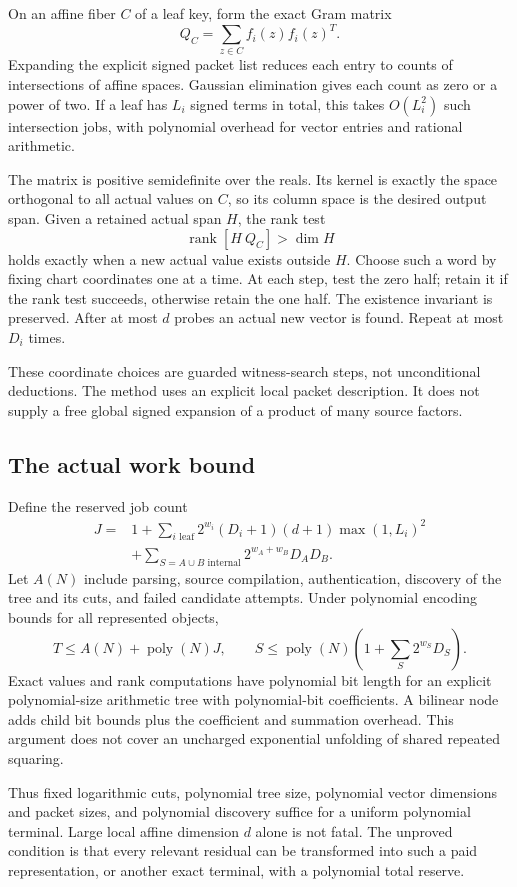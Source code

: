\documentclass[11pt,letterpaper]{article}
\theoremstyle{definition}
\newcommand{\poly}{\operatorname{poly}}
\newcommand{\rank}{\operatorname{rank}}
\begin{document}
On an affine fiber $C$ of a leaf key, form the exact Gram matrix
\[
Q_C=\sum_{z\in C} f_i(z)f_i(z)^T.
\]
Expanding the explicit signed packet list reduces each entry to counts of intersections of affine spaces. Gaussian elimination gives each count as zero or a power of two. If a leaf has $L_i$ signed terms in total, this takes $O(L_i^2)$ such intersection jobs, with polynomial overhead for vector entries and rational arithmetic.

The matrix is positive semidefinite over the reals. Its kernel is exactly the space orthogonal to all actual values on $C$, so its column space is the desired output span. Given a retained actual span $H$, the rank test
\[
\rank[H\ Q_C]>\dim H
\]
holds exactly when a new actual value exists outside $H$. Choose such a word by fixing chart coordinates one at a time. At each step, test the zero half; retain it if the rank test succeeds, otherwise retain the one half. The existence invariant is preserved. After at most $d$ probes an actual new vector is found. Repeat at most $D_i$ times.

These coordinate choices are guarded witness-search steps, not unconditional deductions. The method uses an explicit local packet description. It does not supply a free global signed expansion of a product of many source factors.

\subsection{The actual work bound}

Define the reserved job count
\begin{align}
J={}&1+\sum_{i\text{ leaf}}2^{w_i}(D_i+1)(d+1)\max(1,L_i)^2\\
&+\sum_{S=A\cup B\text{ internal}}2^{w_A+w_B}D_A D_B.\label{eq:jobs}
\end{align}
Let $A(N)$ include parsing, source compilation, authentication, discovery of the tree and its cuts, and failed candidate attempts. Under polynomial encoding bounds for all represented objects,
\[
T\le A(N)+\poly(N)J,
\qquad
S\le\poly(N)\left(1+\sum_S2^{w_S}D_S\right).
\]
Exact values and rank computations have polynomial bit length for an explicit polynomial-size arithmetic tree with polynomial-bit coefficients. A bilinear node adds child bit bounds plus the coefficient and summation overhead. This argument does not cover an uncharged exponential unfolding of shared repeated squaring.

Thus fixed logarithmic cuts, polynomial tree size, polynomial vector dimensions and packet sizes, and polynomial discovery suffice for a uniform polynomial terminal. Large local affine dimension $d$ alone is not fatal. The unproved condition is that every relevant residual can be transformed into such a paid representation, or another exact terminal, with a polynomial total reserve.
\end{document}
